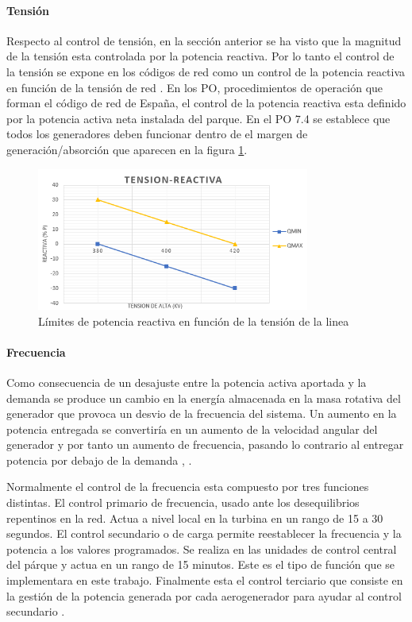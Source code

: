 \documentclass{book}
\begin{document}
		\paragraph{Tensi\'on}
Respecto al control de tensi\'on, en la secci\'on anterior se ha visto que la magnitud de la tensi\'on esta controlada por la potencia reactiva. Por lo tanto el control de la tensi\'on se expone en los c\'odigos de red como un control de la potencia reactiva en funci\'on de la tensi\'on de red \cite{WFgridcode}. En los PO, procedimientos de operaci\'on que forman el c\'odigo de red de España, el control de la potencia reactiva esta definido por la potencia activa neta instalada del parque. En el PO 7.4 \cite{PO74}  se establece que todos los generadores deben funcionar dentro de el margen de generaci\'on/absorci\'on que aparecen en la figura \ref{VQgridcode}.   \par 

\begin{figure}[h!]
\centering
\includegraphics[width=0.8\textwidth]{VQgridcode.PNG}
\caption{L\'imites de potencia reactiva en funci\'on de la tensi\'on de la linea}
\label{VQgridcode}
\end{figure}
\newpage
		\paragraph{Frecuencia}
Como consecuencia de un desajuste entre la potencia activa aportada y la demanda se produce un cambio en la energía almacenada en la masa rotativa del generador que provoca un desvio de la frecuencia del sistema. Un aumento en la potencia entregada se convertir\'ia en un aumento de la velocidad angular del generador y por tanto un aumento de frecuencia, pasando lo contrario al entregar potencia por debajo de la demanda \cite{WFgridcode}, \cite{FrecuencyLvL}. \par

Normalmente el control de la frecuencia esta compuesto por tres funciones distintas. El control primario de frecuencia, usado ante los desequilibrios repentinos en la red. Actua a nivel local en la turbina en un rango de 15 a 30 segundos. El control secundario o de carga permite reestablecer la frecuencia y la potencia a los valores programados. Se realiza en las unidades de control central del p\'arque y actua en un rango de 15 minutos. Este es el tipo de funci\'on que se implementara en este trabajo. Finalmente esta el control terciario que consiste en la gesti\'on de la potencia generada por cada aerogenerador para ayudar al control secundario \cite{WFgridcode}. \par
\end{document}
